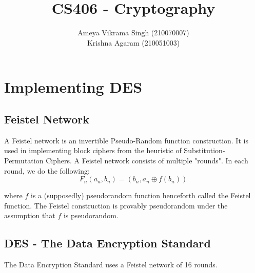 \documentclass{article}
\begin{document}
    \title{ \\ \large{CS406 - Cryptography}}
    \author{Ameya Vikrama Singh (210070007) \\ Krishna Agaram (210051003)}
    \maketitle
    \section{Implementing DES}
    \subsection{Feistel Network}
    A Feistel network is an invertible Pseudo-Random function construction. It is used in implementing block ciphers from the heuristic of Substitution-Permutation Ciphers. A Feistel network consists of multiple "rounds". In each round, we do the following:
    $$F_n(a_n, b_n) = (b_n, a_n \oplus f(b_n))$$

    where $f$ is a (supposedly) pseudorandom function henceforth called the Feistel function. The Feistel construction is provably pseudorandom under the assumption that $f$ is pseudorandom.

    \subsection{DES - The Data Encryption Standard}
    The Data Encryption Standard uses a Feistel network of 16 rounds.
    
\end{document}
